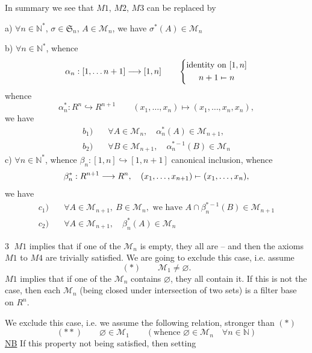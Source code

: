 In summary we see that $M1$, $M2$, $M3$ can be replaced by

a)  $\forall n\in\mathbb N^{*}$, $\sigma\in\mathfrak S_n$, $A\in\mathcal M_n$, we have $\sigma^*(A)\in\mathcal M_n$

b) $\forall n\in\mathbb N^*$, whence
\[
\alpha_n:[1,\ldots n+1]\longrightarrow[1,n]\qquad
\left\{\begin{gathered}\text{identity on }[1,n]\\ n+1\mathrel{\mapstochar\relbar}n\end{gathered}\right.
\]
whence 
\[
\alpha_n^*:R^n\hookrightarrow R^{n+1}\qquad(x_1,\ldots,x_n)\longmapsto(x_1,\ldots,x_n,x_n),
\]
we have
\[
\begin{aligned}
b_1)\quad&\forall A\in\mathcal M_n,\quad\alpha_n^*(A)\in\mathcal M_{n+1},\\
b_2)\quad&\forall B\in\mathcal M_{n+1},\quad\alpha_n^{*-1}(B)\in\mathcal M_n
\end{aligned}
\]
c) $\forall n\in\mathbb N^*$, whence $\beta_n:[1,n]\hookrightarrow[1,n+1]$ canonical inclusion, whence
\[
\beta_n^*:R^{n+1}\longrightarrow R^n,\quad(x_1,\ldots,x_{n+1})\mathrel{\mapstochar\relbar}(x_1,\ldots,x_n),
\]
we have
\[
\begin{aligned}
c_1)\quad&\forall A\in\mathcal M_{n+1},\ B\in\mathcal M_n,\text{ we have }A\cap\beta_n^{*-1}(B)\in\mathcal M_{n+1}\\
c_2)\quad&\forall A\in\mathcal M_{n+1},\quad\beta_n^*(A)\in\mathcal M_n
\end{aligned}
\]

\textcircled{3} $M1$ implies that if one of the $\mathcal M_n$ is empty, they all are -- and then the axioms $M1$ to $M4$ are trivially satisfied. We are going to exclude this  case, i.e. assume
\[
(*)\qquad\mathcal M_1\ne\varnothing.
\]
$M1$ implies that if one of the $\mathcal M_n$ contains $\varnothing$, they all contain it. If this is not the case, then each $\mathcal M_n$ (being closed under intersection of two sets) is a filter base on $R^n$.

We exclude this case, i.e. we assume the following relation, stronger than $(*)$
\[
(**)\qquad\varnothing\in\mathcal M_1\qquad(\text{whence }\varnothing\in\mathcal M_n\quad\forall n\in\mathbb N)
\]
\uline{NB} If this property not being satisfied, then setting

